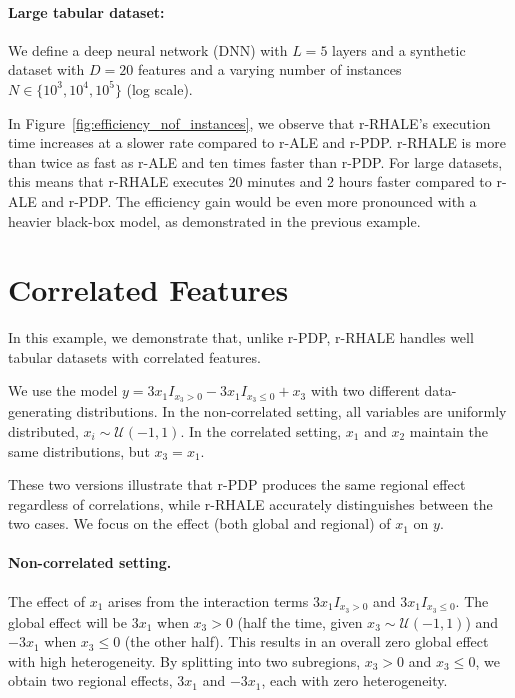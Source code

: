\documentclass[
twocolumn,
]{ceurart}
\begin{document}
\paragraph{Large tabular dataset:}

We define a deep neural network (DNN) with \( L = 5 \) layers and a synthetic dataset with \( D = 20 \) features and a varying number of instances \( N \in \{10^3, 10^4, 10^5\} \) (log scale).

In Figure~\ref{fig:efficiency_nof_instances}, we observe that r-RHALE's execution time increases at a slower rate compared to r-ALE and r-PDP. r-RHALE is more than twice as fast as r-ALE and ten times faster than r-PDP. For large datasets, this means that r-RHALE executes 20 minutes and 2 hours faster compared to r-ALE and  r-PDP. The efficiency gain would be even more pronounced with a heavier black-box model, as demonstrated in the previous example.


\section{Correlated Features}
\label{sec:correlated-features}

In this example, we demonstrate that, unlike r-PDP, r-RHALE handles well tabular datasets with correlated features.

We use the model \( y = 3x_1I_{x_3 > 0} - 3x_1I_{x_3 \leq 0} + x_3 \) with two different data-generating distributions. In the non-correlated setting, all variables are uniformly distributed, \( x_i \sim \mathcal{U}(-1,1) \). In the correlated setting, \( x_1 \) and \( x_2 \) maintain the same distributions, but \( x_3 = x_1 \).

These two versions illustrate that r-PDP produces the same regional effect regardless of correlations, while r-RHALE accurately distinguishes between the two cases. We focus on the effect (both global and regional) of \( x_1 \) on \( y \).

\paragraph{Non-correlated setting.}

The effect of \( x_1 \) arises from the interaction terms \( 3x_1I_{x_3>0} \) and \( 3x_1I_{x_3\leq0} \). The global effect will be \( 3x_1 \) when \( x_3 > 0 \) (half the time, given \( x_3 \sim \mathcal{U}(-1,1) \)) and \( -3x_1 \) when \( x_3 \leq 0 \) (the other half). This results in an overall zero global effect with high heterogeneity. By splitting into two subregions, \( x_3 > 0 \) and \( x_3 \leq 0 \), we obtain two regional effects, \( 3x_1 \) and \( -3x_1 \), each with zero heterogeneity.
\end{document}
